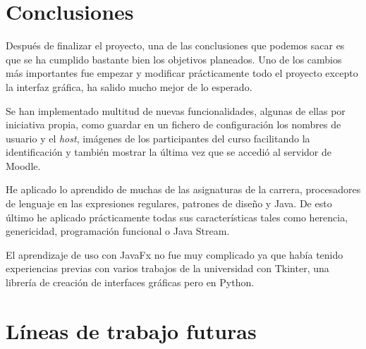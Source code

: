 
\section{Conclusiones}

Después de finalizar el proyecto, una de las conclusiones que podemos sacar es que se ha cumplido bastante bien los objetivos planeados. Uno de los cambios más importantes fue empezar y modificar prácticamente todo el proyecto excepto la interfaz gráfica, ha salido mucho mejor de lo esperado.  

Se han implementado multitud de nuevas funcionalidades, algunas de ellas por iniciativa propia, como guardar en un fichero de configuración los nombres de usuario y el \textit{host}, imágenes de los participantes del curso facilitando la identificación y también mostrar la última vez que se accedió al servidor de Moodle.

He aplicado lo aprendido de muchas de las asignaturas de la carrera, procesadores de lenguaje en las expresiones regulares, patrones de diseño y Java. De esto último he aplicado prácticamente todas sus características tales como herencia, genericidad, programación funcional o Java Stream.

El aprendizaje de uso con JavaFx no fue muy complicado ya que había tenido experiencias previas con varios trabajos de la universidad con Tkinter\cite{noauthor_tkinter_nodate}, una librería de creación de interfaces gráficas pero en Python.

\section{Líneas de trabajo futuras}
